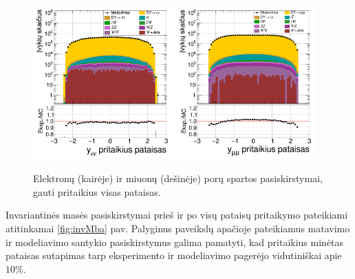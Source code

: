 \documentclass[a4paper, 12pt, oneside]{article}
\begin{document}
\begin{figure}[H]
	\includegraphics[width=0.48\textwidth]{ee_rapi_after.png}
	\includegraphics[width=0.48\textwidth]{mumu_rapi_after.png}
	\caption{\label{fig:rapia} Elektronų (kairėje) ir miuonų (dešinėje) porų spartos pasiskirstymai,
		gauti pritaikius visas pataisas.}
\end{figure}


Invariantinės masės pasiskirstymai prieš ir po visų pataisų pritaikymo pateikiami atitinkamai \ref{fig:invMba} pav.
Palyginus paveikslų apačioje pateikiamus matavimo ir modeliavimo santykio pasiskirstymus galima pamatyti, kad
pritaikius minėtas pataisas sutapimas tarp eksperimento ir modeliavimo pagerėjo vidutiniškai apie $10\%$.
\end{document}
